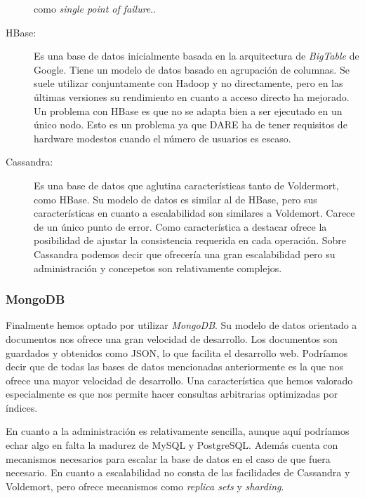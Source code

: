 \begin{description}
{    como \emph{single point of failure}.}.
\item[HBase:] Es una base de datos inicialmente basada en la
  arquitectura de \emph{BigTable} de Google. Tiene un modelo de datos
  basado en agrupación de columnas. Se suele utilizar conjuntamente
  con Hadoop\cite{HADOOP} y no directamente, pero en las últimas
  versiones su rendimiento en cuanto a acceso directo ha mejorado. Un
  problema con HBase es que no se adapta bien a ser ejecutado en un
  único nodo. Esto es un problema ya que DARE ha de tener requisitos
  de hardware modestos cuando el número de usuarios es escaso.
\item[Cassandra:] Es una base de datos que aglutina características
  tanto de Voldermort, como HBase. Su modelo de datos es similar al de
  HBase, pero sus características en cuanto a escalabilidad son
  similares a Voldemort. Carece de un único punto de error. Como
  característica a destacar ofrece la posibilidad de ajustar la
  consistencia requerida en cada operación. Sobre Cassandra podemos
  decir que ofrecería una gran escalabilidad pero su administración y
  concepetos son relativamente complejos.
\end{description}

\subsubsection{MongoDB}

Finalmente hemos optado por utilizar \emph{MongoDB}. Su modelo de
datos orientado a documentos nos ofrece una gran velocidad de
desarrollo. Los documentos son guardados y obtenidos como JSON, lo que
facilita el desarrollo web. Podríamos decir que de todas las bases de
datos mencionadas anteriormente es la que nos ofrece una mayor
velocidad de desarrollo. Una característica que hemos valorado
especialmente es que nos permite hacer consultas arbitrarias
optimizadas por índices.

En cuanto a la administración es relativamente sencilla, aunque aquí
podríamos echar algo en falta la madurez de MySQL y PostgreSQL. Además
cuenta con mecanismos necesarios para escalar la base de datos en el
caso de que fuera necesario. En cuanto a escalabilidad no consta de
las facilidades de Cassandra y Voldemort, pero ofrece mecanismos como
\emph{replica sets} y \emph{sharding}.


